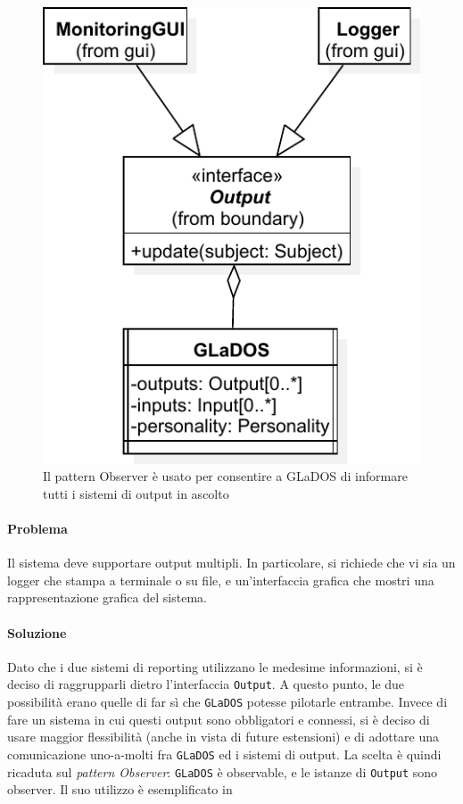 \documentclass[a4paper,12pt]{report}
\begin{document}
\begin{figure}[H]
\centering{}
\includegraphics[width=.7\textwidth]{img/observer}
\caption{Il pattern Observer è usato per consentire a GLaDOS di informare tutti i sistemi di output in ascolto}
\label{img:observer}
\end{figure}

\paragraph{Problema} Il sistema deve supportare output multipli. In particolare, si richiede che vi sia un logger che stampa a terminale o su file,
e un'interfaccia grafica che mostri una rappresentazione grafica del sistema.

\paragraph{Soluzione} Dato che i due sistemi di reporting utilizzano le medesime informazioni, si è deciso di raggrupparli dietro l'interfaccia \texttt{Output}.
A questo punto, le due possibilità erano quelle di far sì che \texttt{GLaDOS} potesse pilotarle entrambe.
Invece di fare un sistema in cui questi output sono obbligatori e connessi, si è deciso di usare maggior flessibilità (anche in vista di future estensioni)
e di adottare una comunicazione uno-a-molti fra \texttt{GLaDOS} ed i sistemi di output.
La scelta è quindi ricaduta sul \textit{pattern Observer}: \texttt{GLaDOS} è observable, e le istanze di \texttt{Output} sono observer.
%
Il suo utilizzo è esemplificato in 
\end{document}
